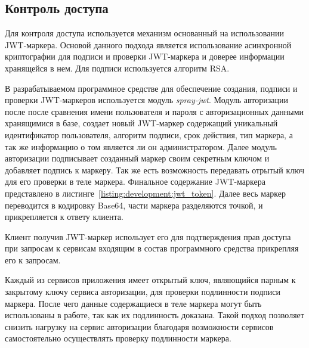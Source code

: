 



\subsection{Контроль доступа}
\label{sec:development:access_control}
Для контроля доступа используется механизм основанный на использовании JWT-маркера. Основой данного подхода является использование асинхронной криптографии для подписи и проверки JWT-маркера и доверее информации хранящейся в нем. Для подписи используется алгоритм RSA.

В разрабатываемом программное средстве для обеспечение создания, подписи и проверки JWT-маркеров используется модуль \emph{spray-jwt}. Модуль авторизации после после сравнения имени пользователя и пароля с авторизационных данными хранящимися в базе, создает новый JWT-маркер содержащий уникальный идентификатор пользователя, алгоритм подписи, срок действия, тип маркера, а так же информацию о том является ли он администратором. Далее модуль авторизации подписывает созданный маркер своим секретным ключом и добавляет подпись к маркеру. Так же есть возможность передавать отрытый ключ для его проверки в теле маркера.
Финальное содержание JWT-маркера представлено в листинге~\ref{listing:development:jwt_token}. Далее весь маркер переводится в кодировку Base64, части маркера разделяются точкой, и прикрепляется к ответу клиента.


Клиент получив JWT-маркер использует его для подтверждения прав доступа при запросам к сервисам входящим в состав программного средства прикрепляя его к запросам.

Каждый из сервисов приложения имеет открытый ключ, являющийся парным к закрытому ключу сервиса авторизации, для проверки подлинности подписи маркера. После чего данные содержащиеся в теле маркера могут быть использованы в работе, так как их подлинность доказана. Такой подход позволяет снизить нагрузку на сервис авторизации благодаря возможности сервисов самостоятельно осуществлять проверку подлинности маркера.

